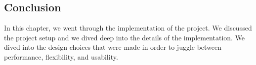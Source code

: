 \begin{spacing}{1.2}
    \section*{Conclusion}
    In this chapter, we went through the implementation of the project. We discussed the
    project setup and we dived deep into the details of the implementation. We dived into
    the design choices that were made in order to juggle between performance, flexibility,
    and usability.

\end{spacing}
